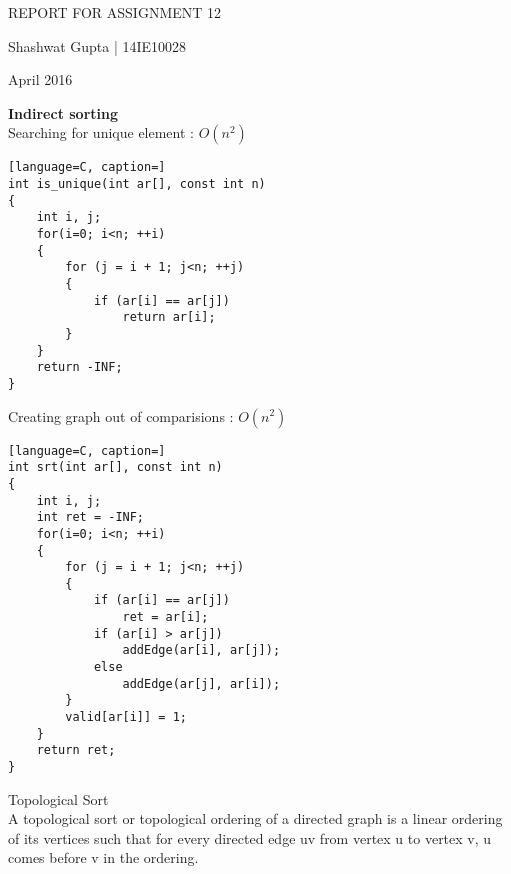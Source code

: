 \documentclass{article}
\begin{document}

\lstset{style=mystyle}

\centerline{\sc \large REPORT FOR ASSIGNMENT 12}
\vspace{1.5pc}
\centerline{\sc Shashwat Gupta | 14IE10028 }
\centerline{ April 2016 }
\vspace{4pc}


\textbf{Indirect sorting} \\

Searching for unique element : $O(n^2)$

\begin{lstlisting}[language=C, caption=]
int is_unique(int ar[], const int n)
{
    int i, j;
    for(i=0; i<n; ++i)
    {
        for (j = i + 1; j<n; ++j)
        {
            if (ar[i] == ar[j])
                return ar[i];
        }
    }
    return -INF;
}
\end{lstlisting}

Creating graph out of comparisions : $O(n^2)$

\begin{lstlisting}[language=C, caption=]
int srt(int ar[], const int n)
{
    int i, j;
    int ret = -INF;
    for(i=0; i<n; ++i)
    {
        for (j = i + 1; j<n; ++j)
        {
            if (ar[i] == ar[j])
                ret = ar[i];
            if (ar[i] > ar[j])
                addEdge(ar[i], ar[j]);
            else
                addEdge(ar[j], ar[i]);
        }
        valid[ar[i]] = 1;
    }
    return ret;
}
\end{lstlisting}

Topological Sort \\
A topological sort or topological ordering of a directed graph is a linear ordering of its vertices such that for every directed edge uv from vertex u to vertex v, u comes before v in the ordering. 
\end{document}
